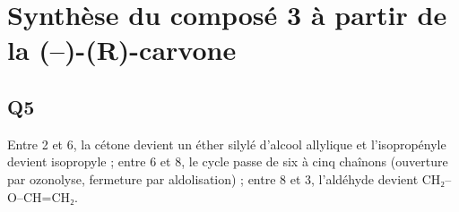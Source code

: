 \documentclass[11pt,a4paper]{article}
\begin{document}
\hypertarget{synthuxe8se-du-composuxe9-3-uxe0-partir-de-la--r-carvone}{%
\section{Synthèse du composé 3 à partir de la (--)-(R)-carvone}\label{synthuxe8se-du-composuxe9-3-uxe0-partir-de-la--r-carvone}}

\hypertarget{q5}{%
\subsection{Q5}\label{q5}}

Entre 2 et 6, la cétone devient un éther silylé d'alcool allylique et l'isopropényle devient isopropyle ; entre 6 et 8, le cycle passe de six à cinq chaînons (ouverture par ozonolyse, fermeture par aldolisation) ; entre 8 et 3, l'aldéhyde devient CH₂--O--CH=CH₂.
\end{document}
